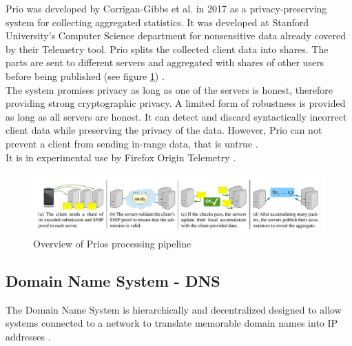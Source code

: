         Prio was developed by Corrigan-Gibbs et al. \cite{corrigan-gibbs_prio_2017} in 2017 as a privacy-preserving system for collecting aggregated statistics.
        It was developed at Stanford University's Computer Science department for nonsensitive data already covered by their Telemetry tool. 
        Prio splits the collected client data into shares. 
        The parts are sent to different servers and aggregated with shares of other users before being published (see figure \ref{fig:prio_overview}) \cite{corrigan-gibbs_prio_2017}.\\
        The system promises privacy as long as one of the servers is honest, therefore providing strong cryptographic privacy. A limited form of robustness is provided as long as all servers are honest. It can detect and discard syntactically incorrect client data while preserving the privacy of the data. However, Prio can not prevent a client from sending in-range data, that is untrue \cite{corrigan-gibbs_prio_2017}.\\
        It is in experimental use by Firefox Origin Telemetry \cite{englehardt_next_2019}.
        \begin{figure}[hb]
            \centering
            \includegraphics[width=\textwidth]{latex/figures/prio_overview.jpg}
            \caption[Overview of Prios processing pipeline]{Overview of Prios processing pipeline \cite{corrigan-gibbs_prio_2017}}
            \label{fig:prio_overview}
        \end{figure}
        
%
\newpage
    \subsection{Domain Name System - DNS}
        \label{subsec:related:dns}
        The Domain Name System is hierarchically and decentralized designed to allow systems connected to a network to translate memorable domain names into IP addresses \cite{stevens_tcpip_1993}.\\


